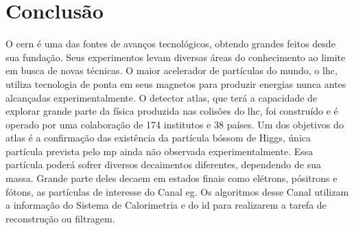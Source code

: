 \chapter{Conclusão}

O \gls{cern} é uma das fontes de avanços tecnológicos, obtendo grandes feitos
desde sua fundação. Seus experimentos
levam diversas áreas do conhecimento ao limite em busca de novas técnicas. 
O maior acelerador de partículas do mundo, o \gls{lhc}, utiliza
tecnologia de ponta em seus magnetos para produzir energias nunca antes
alcançadas experimentalmente. O detector \gls{atlas}, que terá a
capacidade de explorar grande parte da física produzida nas colisões do
\gls{lhc}, foi construído e é operado por uma colaboração de 174 institutos e 38 
países. 
Um dos objetivos do \gls{atlas} é a
confirmação das existência da partícula bóssom de Higgs, única partícula
prevista pelo \gls{mp} ainda não observada experimentalmente. Essa partícula
poderá sofrer diversos decaimentos diferentes, dependendo de sua massa. Grande
parte deles decaem em estados finais como elétrons, pósitrons e fótons, as
partículas de interesse do Canal \gls{eg}. 
Os algoritmos desse Canal utilizam a informação do Sistema de Calorimetria e do
\acrlong{id} para realizarem a tarefa de reconstrução ou filtragem.

